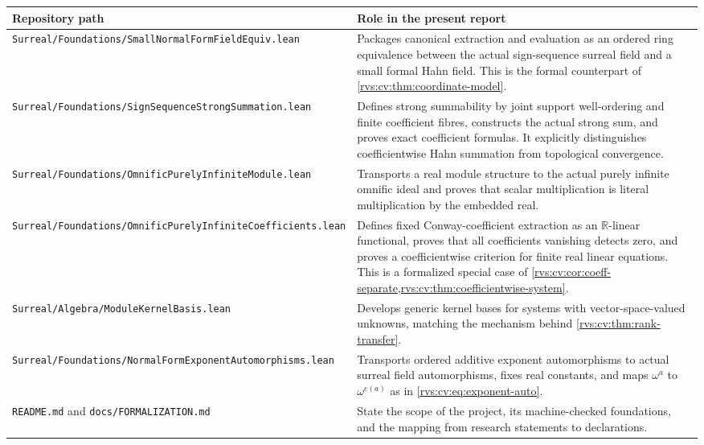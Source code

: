 \documentclass[11pt,letterpaper]{article}
\numberwithin{equation}{section}
\theoremstyle{definition}
\theoremstyle{remark}
\newcommand{\R}{\mathbb{R}}
\newcommand{\pathcode}[1]{\nolinkurl{#1}}
\begin{document}
\begin{longtable}{>{\raggedright\arraybackslash}p{}
                  >{\raggedright\arraybackslash}p{}}
\toprule
\textbf{Repository path} & \textbf{Role in the present report}\\
\midrule
\endhead
\pathcode{Surreal/Foundations/SmallNormalFormFieldEquiv.lean}
& Packages canonical extraction and evaluation as an ordered ring equivalence
between the actual sign-sequence surreal field and a small formal Hahn field.
This is the formal counterpart of \cref{rvs:cv:thm:coordinate-model}.\\[0.4em]

\pathcode{Surreal/Foundations/SignSequenceStrongSummation.lean}
& Defines strong summability by joint support well-ordering and finite coefficient
fibres, constructs the actual strong sum, and proves exact coefficient formulas.
It explicitly distinguishes coefficientwise Hahn summation from topological
convergence.\\[0.4em]

\pathcode{Surreal/Foundations/OmnificPurelyInfiniteModule.lean}
& Transports a real module structure to the actual purely infinite omnific ideal
and proves that scalar multiplication is literal multiplication by the embedded
real.\\[0.4em]

\pathcode{Surreal/Foundations/OmnificPurelyInfiniteCoefficients.lean}
& Defines fixed Conway-coefficient extraction as an $\R$-linear functional,
proves that all coefficients vanishing detects zero, and proves a coefficientwise
criterion for finite real linear equations. This is a formalized special case of
\cref{rvs:cv:cor:coeff-separate,rvs:cv:thm:coefficientwise-system}.\\[0.4em]

\pathcode{Surreal/Algebra/ModuleKernelBasis.lean}
& Develops generic kernel bases for systems with vector-space-valued unknowns,
matching the mechanism behind \cref{rvs:cv:thm:rank-transfer}.\\[0.4em]

\pathcode{Surreal/Foundations/NormalFormExponentAutomorphisms.lean}
& Transports ordered additive exponent automorphisms to actual surreal field
automorphisms, fixes real constants, and maps $\omega^a$ to $\omega^{e(a)}$ as in
\eqref{rvs:cv:eq:exponent-auto}.\\[0.4em]

\pathcode{README.md} and \pathcode{docs/FORMALIZATION.md}
& State the scope of the project, its machine-checked foundations, and the mapping
from research statements to declarations.\\
\bottomrule
\end{longtable}
\end{document}
